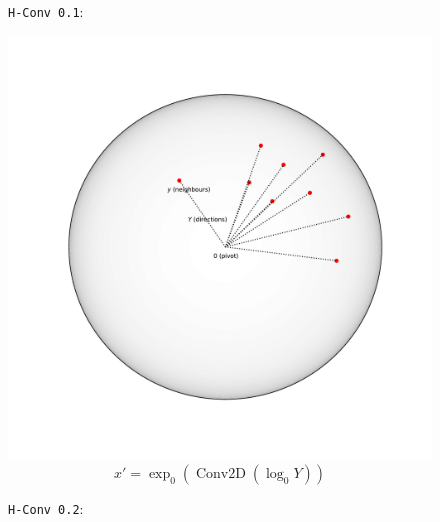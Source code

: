 \begin{figure}
    \noindent\begin{minipage}{\textwidth}
        \begin{minipage}[c][8cm][c]{\dimexpr0.5\textwidth-0.5\Colsep\relax}
            \texttt{H-Conv 0.1}:

            \includegraphics[width=.85\linewidth]{art/absolute-locations.pdf}
            \[ x' = \exp_0\left(
                \operatorname{Conv2D}\left(
                    \log_0 Y
                    \right)\right) \]
        \end{minipage}\hfill
        \begin{minipage}[c][8cm][c]{\dimexpr0.5\textwidth-0.5\Colsep\relax}
            \texttt{H-Conv 0.2}:


\end{minipage}
\end{minipage}
\end{figure}
